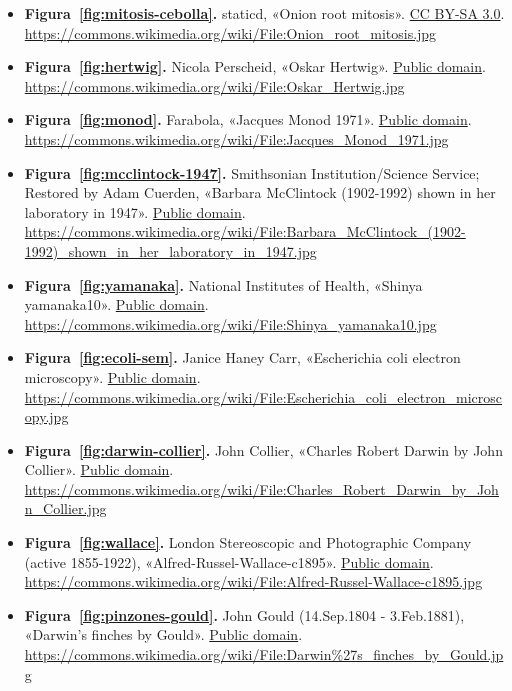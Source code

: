 \documentclass{book}
\begin{document}
\begin{itemize}
\item \textbf{Figura~\ref{fig:mitosis-cebolla}.} staticd, «Onion root mitosis». \href{https://creativecommons.org/licenses/by-sa/3.0/}{CC BY-SA 3.0}. \url{https://commons.wikimedia.org/wiki/File:Onion_root_mitosis.jpg}
\item \textbf{Figura~\ref{fig:hertwig}.} Nicola Perscheid, «Oskar Hertwig». \href{https://creativecommons.org/publicdomain/mark/1.0/}{Public domain}. \url{https://commons.wikimedia.org/wiki/File:Oskar_Hertwig.jpg}
\item \textbf{Figura~\ref{fig:monod}.} Farabola, «Jacques Monod 1971». \href{https://creativecommons.org/publicdomain/mark/1.0/}{Public domain}. \url{https://commons.wikimedia.org/wiki/File:Jacques_Monod_1971.jpg}
\item \textbf{Figura~\ref{fig:mcclintock-1947}.} Smithsonian Institution/Science Service; Restored by Adam Cuerden, «Barbara McClintock (1902-1992) shown in her laboratory in 1947». \href{https://creativecommons.org/publicdomain/mark/1.0/}{Public domain}. \url{https://commons.wikimedia.org/wiki/File:Barbara_McClintock_(1902-1992)_shown_in_her_laboratory_in_1947.jpg}
\item \textbf{Figura~\ref{fig:yamanaka}.} National Institutes of Health, «Shinya yamanaka10». \href{https://creativecommons.org/publicdomain/mark/1.0/}{Public domain}. \url{https://commons.wikimedia.org/wiki/File:Shinya_yamanaka10.jpg}
\item \textbf{Figura~\ref{fig:ecoli-sem}.} Janice Haney Carr, «Escherichia coli electron microscopy». \href{https://creativecommons.org/publicdomain/mark/1.0/}{Public domain}. \url{https://commons.wikimedia.org/wiki/File:Escherichia_coli_electron_microscopy.jpg}
\item \textbf{Figura~\ref{fig:darwin-collier}.} John Collier, «Charles Robert Darwin by John Collier». \href{https://creativecommons.org/publicdomain/mark/1.0/}{Public domain}. \url{https://commons.wikimedia.org/wiki/File:Charles_Robert_Darwin_by_John_Collier.jpg}
\item \textbf{Figura~\ref{fig:wallace}.} London Stereoscopic and Photographic Company (active 1855-1922), «Alfred-Russel-Wallace-c1895». \href{https://creativecommons.org/publicdomain/mark/1.0/}{Public domain}. \url{https://commons.wikimedia.org/wiki/File:Alfred-Russel-Wallace-c1895.jpg}
\item \textbf{Figura~\ref{fig:pinzones-gould}.} John Gould (14.Sep.1804 - 3.Feb.1881), «Darwin's finches by Gould». \href{https://creativecommons.org/publicdomain/mark/1.0/}{Public domain}. \url{https://commons.wikimedia.org/wiki/File:Darwin%27s_finches_by_Gould.jpg}

\end{itemize}
\end{document}
